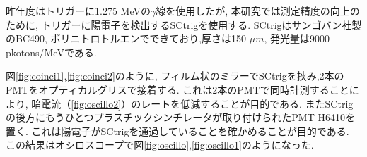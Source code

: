 昨年度はトリガーに1.275 MeVの$\gamma$線を使用したが,
本研究では測定精度の向上のために,
トリガーに陽電子を検出するSCtrigを使用する.
SCtrigはサンゴバン社製のBC490,
ポリニトロトルエンでできており,厚さは150 $\si{\mu m}$,
発光量は9000 pkotons/MeVである.

図\ref{fig:coinci1},\ref{fig:coinci2}のように,
フィルム状のミラーでSCtrigを挟み,2本のPMTをオプティカルグリスで接着する.
これは2本のPMTで同時計測することにより,
暗電流（\ref{fig:oscillo2}）のレートを低減することが目的である.
またSCtrigの後方にもうひとつプラスチックシンチレータが取り付けられたPMT H6410を置く.
これは陽電子がSCtrigを通過していることを確かめることが目的である.
この結果はオシロスコープで図\ref{fig:oscillo},\ref{fig:oscillo1}のようになった.

